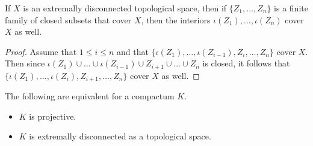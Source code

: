 \begin{lem}
	If $ X $ is an extremally disconnected topological space, then if $ \{ Z_1, \dots, Z_n \} $ is a finite family of closed subsets that cover $ X $, then the interiors $ \iota(Z_1), \dots, \iota(Z_n) $ cover $ X $ as well.
\end{lem}

\begin{proof}
	Assume that $ 1 \leq i \leq n $ and that $ \{ \iota(Z_1), \dots, \iota(Z_{i-1}), Z_i, \dots, Z_n \} $ cover $ X $.
	Then since $ \iota(Z_1) \cup \dots \cup \iota(Z_{i-1}) \cup Z_{i+1} \cup \dots \cup Z_n $ is closed, it follows that $ \{ \iota(Z_1), \dots, \iota(Z_i), Z_{i+1}, \dots, Z_n \} $ cover $ X $ as well.
\end{proof}

\begin{prp}
	The following are equivalent for a compactum $ K $.
	\begin{itemize}
		\item $ K $ is projective.
		\item $ K $ is extremally disconnected as a topological space.
	\end{itemize}
\end{prp}

